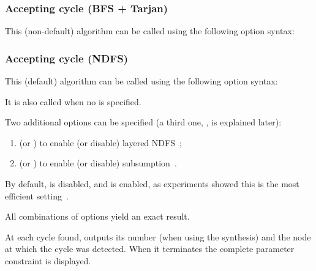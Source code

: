 \subsubsection{Accepting cycle (BFS + Tarjan)}\label{sss:accepting-loop-BFS}

This (non-default) algorithm can be called using the following option syntax:



\subsubsection{Accepting cycle (NDFS)}\label{sss:accepting-loop-NDFS}

This (default) algorithm can be called using the following option syntax:


It is also called when no  is specified.

Two additional options can be specified (a third one, , is explained later):
\begin{enumerate}
	\item {} (or ) to enable (or disable) layered NDFS~\cite{NPP18};
	\item {} (or ) to enable (or disable) subsumption~\cite{NPP18}.
\end{enumerate}
By default,  is disabled, and  is enabled, as experiments showed this is the most efficient setting~\cite{NPP18}.

All combinations of options yield an exact result.




At each cycle found, \imitator{} outputs its number (when using the synthesis) and
the node at which the cycle was detected. When it terminates the complete parameter
constraint is displayed.


